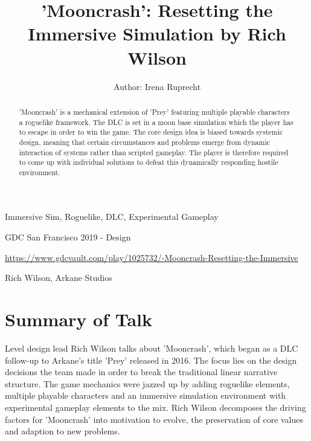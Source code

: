\documentclass[a4paper]{article}
\title{'Mooncrash': Resetting the Immersive Simulation by Rich Wilson}
\author{Author: Irena Ruprecht}
\begin{document}
\maketitle

\begin{keywords} Immersive Sim, Roguelike, DLC, Experimental Gameplay \end{keywords}

\begin{track} GDC San Francisco 2019 - Design \end{track}

\begin{talkurl}  \url{https://www.gdcvault.com/play/1025732/-Mooncrash-Resetting-the-Immersive} \end{talkurl}

\begin{speaker} Rich Wilson, Arkane Studios \end{speaker}


\begin{abstract}
'Mooncrash' is a mechanical extension of 'Prey' featuring multiple playable characters a roguelike framework. The DLC is set in a moon base simulation which the player has to escape in order to win the game. The core design idea is biased towards systemic design, meaning that certain circumstances and problems emerge from dynamic interaction of systems rather than scripted gameplay. The player is therefore required to come up with individual solutions to defeat this dynamically responding hostile environment. 
\end{abstract}

\section{Summary of Talk}
Level design lead Rich Wilson talks about 'Mooncrash', which began as a DLC follow-up to Arkane's title 'Prey' released in 2016. The focus lies on the design decisions the team made in order to break the traditional linear narrative structure. The game mechanics were jazzed up by adding roguelike elements, multiple playable characters and an immersive simulation environment with experimental gameplay elements to the mix. Rich Wilson decomposes the driving factors for 'Mooncrash' into motivation to evolve, the preservation of core values and adaption to new problems. 
\end{document}
